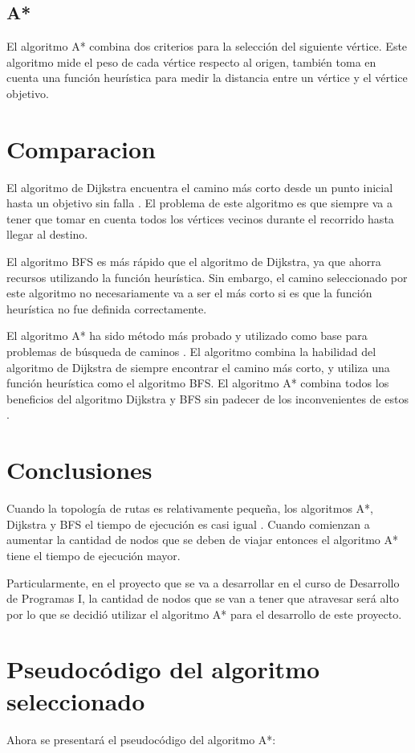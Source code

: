 \documentclass{article}
\begin{document}
\subsection{A*}
El algoritmo A* combina dos criterios para la selección del siguiente vértice. Este
algoritmo mide el peso de cada vértice respecto al origen, también toma en cuenta
una función heurística para medir la distancia entre un vértice y el vértice objetivo.

\section{Comparacion}
El algoritmo de Dijkstra encuentra el camino más corto desde un punto inicial hasta
un objetivo sin falla \autocite{minhang}. El problema de este algoritmo es que siempre
va a tener que tomar en cuenta todos los vértices vecinos durante el recorrido
hasta llegar al destino.

El algoritmo BFS es más rápido que el algoritmo de Dijkstra, ya que ahorra recursos
utilizando la función heurística. Sin embargo, el camino seleccionado por este
algoritmo no necesariamente va a ser el más corto si es que la función heurística
no fue definida correctamente.

El algoritmo A* ha sido método más probado y utilizado como base para problemas
de búsqueda de caminos \autocite{foead}. El algoritmo combina la habilidad del
algoritmo de Dijkstra de siempre encontrar el camino más corto, y utiliza una
función heurística como el algoritmo BFS. El algoritmo A* combina todos los
beneficios del algoritmo Dijkstra y BFS sin padecer de los inconvenientes
de estos \autocite{mehta}.

\section{Conclusiones}
Cuando la topología de rutas es relativamente pequeña, los algoritmos A*, Dijkstra
y BFS el tiempo de ejecución es casi igual \autocite{minhang}. Cuando comienzan
a aumentar la cantidad de nodos que se deben de viajar entonces el algoritmo A*
tiene el tiempo de ejecución mayor.

Particularmente, en el proyecto que se va a desarrollar en el curso de Desarrollo
de Programas I, la cantidad de nodos que se van a tener que atravesar será alto
por lo que se decidió utilizar el algoritmo A* para el desarrollo de este proyecto.

\section{Pseudocódigo del algoritmo seleccionado}
Ahora se presentará el pseudocódigo del algoritmo A*:
\end{document}
